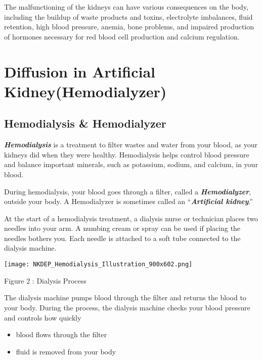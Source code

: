 \documentclass[12pt, a4paper]{article} %
\begin{document}
The malfunctioning of the kidneys can have various consequences on the body, including the buildup of waste products and toxins, electrolyte imbalances, fluid retention, high blood pressure, anemia, bone problems, and impaired production of hormones necessary for red blood cell production and calcium regulation.



\BgThispage

\pagebreak

\section{Diffusion in Artificial Kidney(Hemodialyzer)}

\subsection{Hemodialysis \& Hemodialyzer}

\textbf{{\slshape Hemodialysis}} is a treatment to filter wastes and water from your blood, as your kidneys did when they were healthy. Hemodialysis helps control blood pressure and balance important minerals, such as potassium, sodium, and calcium, in your blood.


During hemodialysis, your blood goes through a filter, called a \textbf{{\slshape Hemodialyzer}}, outside your body. A Hemodialyzer is sometimes called an “\textbf{{\slshape Artificial kidney}}.”

At the start of a hemodialysis treatment, a dialysis nurse or technician places two needles into your arm. A numbing cream or spray can be used if placing the needles bothers you. Each needle is attached to a soft tube connected to the dialysis machine.

\begin{center}
     \texttt{[image: NKDEP\_Hemodialysis\_Illustration\_900x602.png]}
\end{center}
\begin{center}
    Figure 2 : Dialysis Process
\end{center}

The dialysis machine pumps blood through the filter and returns the blood to your body. During the process, the dialysis machine checks your blood pressure and controls how quickly

\begin{itemize}
    \item blood flows through the filter
    \item fluid is removed from your body
\end{itemize}
\end{document}
